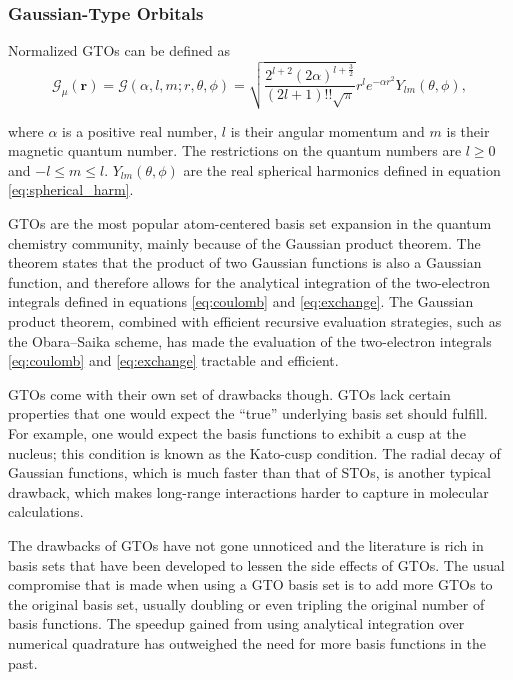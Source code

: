 \documentclass{article}
\begin{document}
\subsubsection{Gaussian-Type Orbitals}\label{subsubsec:gto}
Normalized GTOs can be defined as
\begin{equation}
  \mathcal G_\mu(\mathbf r ) = \mathcal G(\alpha, l,m;r,\theta,\phi)
  = \sqrt{\frac{2^{l+2} (2\alpha)^{l+\frac{3}{2}}}{(2l+1)!! \sqrt{\pi}}}
  r^{l} e^{-\alpha r^2}Y_{lm}(\theta,\phi),
\end{equation}

where $\alpha$ is a positive real number, $l$ is their angular momentum and
$m$ is their magnetic quantum number. The restrictions on the quantum
numbers are $l \geq 0$ and $-l\leq m \leq l$. $Y_{lm}(\theta,\phi)$
are the real spherical harmonics defined in equation
\eqref{eq:spherical_harm}.\cite{Hill2012}

GTOs are the most popular atom-centered basis set expansion in the
quantum chemistry community,\cite{Hill2012} mainly
because of the Gaussian product theorem.\cite{Boys1950} The theorem
states that the product of two Gaussian functions is
also a Gaussian function, and therefore allows for the analytical
integration of the two-electron integrals defined in equations
\eqref{eq:coulomb} and
\eqref{eq:exchange}. The Gaussian product theorem, combined with
efficient recursive evaluation strategies, such as the Obara--Saika
scheme, has made the evaluation of the two-electron integrals
\eqref{eq:coulomb} and \eqref{eq:exchange} tractable and
efficient.\cite{Obara1986, Ahlrichs2006}

GTOs come with their own set of drawbacks though. GTOs lack certain
properties that one would expect the ``true'' underlying basis set
should fulfill. For example, one would expect the basis functions to
exhibit a cusp at the nucleus; this condition is known as the
Kato-cusp condition.\cite{Kato1957} The radial decay of Gaussian
functions, which is much faster than that of STOs, is another typical
drawback, which makes long-range interactions harder to capture in
molecular calculations.\cite{Hill2012}

The drawbacks of GTOs have not gone unnoticed and the literature is
rich in basis sets that have been developed to lessen the side
effects of GTOs. The usual compromise that is made when using a GTO
basis set is to add more GTOs to the original basis set,
usually doubling or even tripling the original number of basis
functions.\cite{Ditchfield1971, Dunning1989} The speedup gained from
using analytical integration over numerical quadrature has outweighed
the need for more basis functions in the past.
\end{document}
